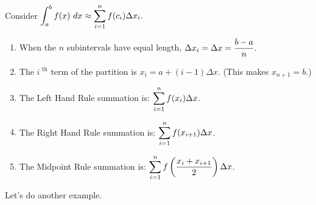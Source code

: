 {Consider $\displaystyle \int_a^b f(x) \ dx \approx \sum_{i=1}^n f(c_i)\Delta x_i.$ 

\begin{enumerate}
\item	When the $n$ subintervals have equal length, $\displaystyle \Delta x_i = \Delta x = \frac{b-a}n.$
\item		The $i^\text{ th}$ term of the partition is $x_i = a + (i-1)\Delta x$. (This makes $x_{n+1} = b$.)
\item		The Left Hand Rule summation is: $\displaystyle \sum_{i=1}^n f(x_i)\Delta x$.
\item		The Right Hand Rule summation is: $\displaystyle \sum_{i=1}^n f(x_{i+1})\Delta x$.
\item		The Midpoint Rule summation is: $\displaystyle \sum_{i=1}^n f\left(\frac{x_i+x_{i+1}}{2}\right)\Delta x$.
\end{enumerate}
}
\restoreboxwidth
%
%
%


Let's do another example.\\


